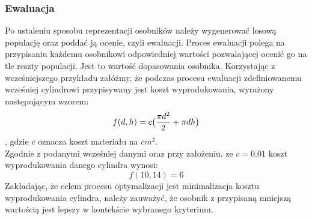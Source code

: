 \documentclass[twoside]{iisthesis}
\begin{document}
\subsubsection{Ewaluacja}
Po ustaleniu sposobu reprezentacji osobników należy wygenerować losową populację oraz poddać ją ocenie, czyli ewaluacji. Proces ewaluacji polega na przypisaniu każdemu osobnikowi odpowiedniej wartości pozwalającej ocenić go na tle reszty populacji. Jest to wartość dopasowania osobnika. Korzystając z wcześniejszego przykładu załóżmy, że podczas procesu ewaluacji zdefiniowanemu wcześniej cylindrowi przypisywany jest koszt wyprodukowania, wyrażony następującym wzorem:
\begin{equation}
f(d,h) = c\big{(}\dfrac{\pi d^{2}}{2} + \pi dh\big{)}
\end{equation}
, gdzie $c$ oznacza koszt materiału na $cm^{2}$.\\
Zgodnie z podanymi wcześniej danymi oraz przy założeniu, ze $c = 0.01$ koszt wyprodukowania danego cylindra wynosi:
\[f(10, 14) = 6\]
Zakładając, że celem procesu optymalizacji jest minimalizacja kosztu wyprodukowania cylindra, należy zauważyć, że osobnik z przypisaną mniejszą wartością jest lepszy w kontekście wybranego kryterium.
\end{document}
